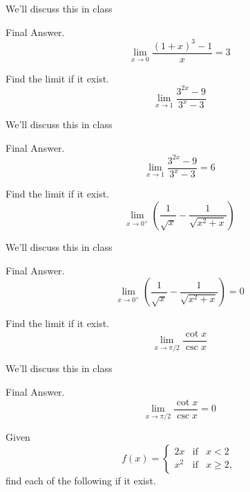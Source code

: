 \documentclass[12pt,addpoints, answers, fleqn]{exam}
\begin{document}
\begin{questions}
\begin{solution}
We'll discuss this in class

Final Answer.
\[
\lim_{x \to 0} \frac{\left(1+x\right)^3-1}{x} = 3
\]
\end{solution}


\question Find the limit if it exist.
\[
\lim_{x \to 1} \frac{3^{2x}-9}{3^x-3}
\]

\begin{solution}
We'll discuss this in class

Final Answer.
\[
\lim_{x \to 1} \frac{3^{2x}-9}{3^x-3} = 6
\]
\end{solution}


\question Find the limit if it exist.
\[
\lim_{x \to 0^+} \left(\frac{1}{\sqrt{x}} - \frac{1}{\sqrt{x^2+x}}\right)
\]

\begin{solution}
We'll discuss this in class

Final Answer.
\[
\lim_{x \to 0^+} \left(\frac{1}{\sqrt{x}} - \frac{1}{\sqrt{x^2+x}}\right) =0
\]
\end{solution}


\question Find the limit if it exist.
\[
\lim_{x \to \pi/2} \frac{\cot x}{\csc x}
\]

\begin{solution}
We'll discuss this in class

Final Answer.
\[
\lim_{x \to \pi/2} \frac{\cot x}{\csc x} =0
\]
\end{solution}








\question Given
\[
f \left( x \right) = \left\{ {\begin{array}{ccc}
   {2x} & {\mbox{if}} & {x<2}  \\
   {x^2} & {\mbox{if}} & {x \geq2 }  ,
 \end{array} } \right.
\]
find each of the following if it exist.
\end{questions}
\end{document}
